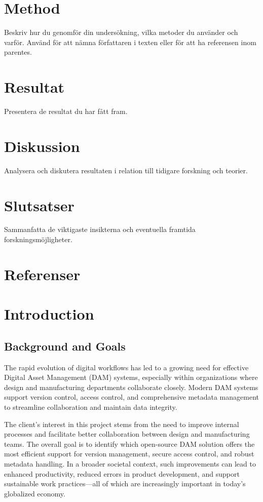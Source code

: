 \documentclass[a4paper,12pt,twocolumn]{article}
\begin{document}
\section{Method}
Beskriv hur du genomför din undersökning, vilka metoder du använder och varför. Använd \citet{example2025} för att nämna författaren i texten eller \citep{example2025} för att ha referensen inom parentes.

\section{Resultat}
Presentera de resultat du har fått fram.

\section{Diskussion}
Analysera och diskutera resultaten i relation till tidigare forskning och teorier.

\section{Slutsatser}
Sammanfatta de viktigaste insikterna och eventuella framtida forskningsmöjligheter.

\section{Referenser}





\section{Introduction}
\subsection{Background and Goals}
The rapid evolution of digital workflows has led to a growing need for effective Digital Asset Management (DAM) systems, especially within organizations where design and manufacturing departments collaborate closely. Modern DAM systems support version control, access control, and comprehensive metadata management to streamline collaboration and maintain data integrity. 

The client’s interest in this project stems from the need to improve internal processes and facilitate better collaboration between design and manufacturing teams. The overall goal is to identify which open-source DAM solution offers the most efficient support for version management, secure access control, and robust metadata handling. In a broader societal context, such improvements can lead to enhanced productivity, reduced errors in product development, and support sustainable work practices—all of which are increasingly important in today’s globalized economy.
\end{document}
